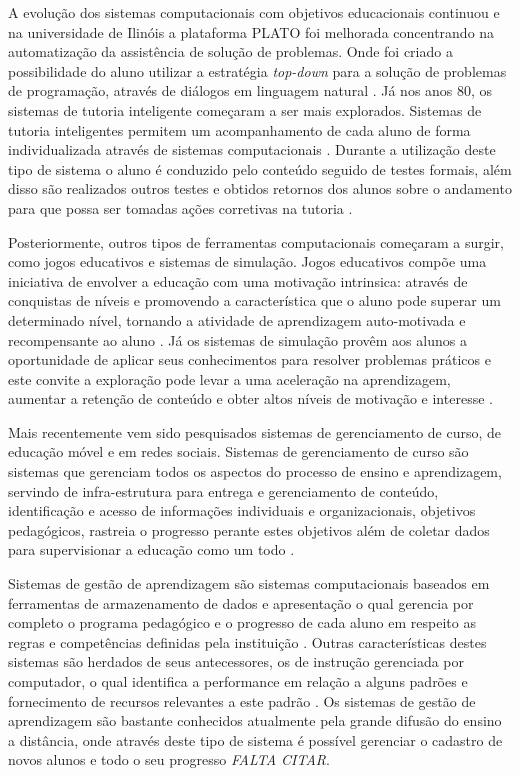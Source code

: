 A evolução dos sistemas computacionais com objetivos educacionais continuou e na universidade de Ilinóis a plataforma PLATO foi melhorada concentrando na automatização da assistência de solução de problemas. Onde foi criado a possibilidade do aluno utilizar a estratégia \emph{top-down} para a solução de problemas de programação, através de diálogos em linguagem natural \cite{danielson75}. Já nos anos 80, os sistemas de tutoria inteligente começaram a ser mais explorados. Sistemas de tutoria inteligentes permitem um acompanhamento de cada aluno de forma individualizada através de sistemas computacionais \cite{bloom84}. Durante a utilização deste tipo de sistema o aluno é conduzido pelo conteúdo seguido de testes formais, além disso são realizados outros testes e obtidos retornos dos alunos sobre o andamento para que possa ser tomadas ações corretivas na tutoria \cite{bloom84}.

Posteriormente, outros tipos de ferramentas computacionais começaram a surgir, como jogos educativos e sistemas de simulação. Jogos educativos compõe uma iniciativa de envolver a educação com uma motivação intrinsica: através de conquistas de níveis e promovendo a característica que o aluno pode superar um determinado nível, tornando a atividade de aprendizagem auto-motivada e recompensante ao aluno \cite{amory99}. Já os sistemas de simulação provêm aos alunos a oportunidade de aplicar seus conhecimentos para resolver problemas práticos e este  convite a exploração pode levar a uma aceleração na aprendizagem, aumentar a retenção de conteúdo e obter altos níveis de motivação e interesse \cite{vandam07}.

Mais recentemente vem sido pesquisados sistemas de gerenciamento de curso, de educação móvel e em redes sociais. Sistemas de gerenciamento de curso são sistemas que gerenciam todos os aspectos do processo de ensino e aprendizagem, servindo de infra-estrutura para entrega e gerenciamento de conteúdo, identificação e acesso de informações individuais e organizacionais, objetivos pedagógicos, rastreia o progresso perante estes objetivos além de coletar dados para supervisionar a educação como um todo \cite{fisher}.

Sistemas de gestão de aprendizagem são sistemas computacionais baseados em ferramentas de armazenamento de dados e apresentação o qual gerencia por completo o programa pedagógico e o progresso de cada aluno em respeito as regras e competências definidas pela instituição \cite{flesher02}. Outras características destes sistemas são herdados de seus antecessores, os de instrução gerenciada por computador, o qual identifica a performance em relação a alguns padrões e fornecimento de recursos relevantes a este padrão \cite{flesher02}.
Os sistemas de gestão de aprendizagem são bastante conhecidos atualmente pela grande difusão do ensino a distância, onde através deste tipo de sistema é possível gerenciar o cadastro de novos alunos e todo o seu progresso \emph{FALTA CITAR}.

